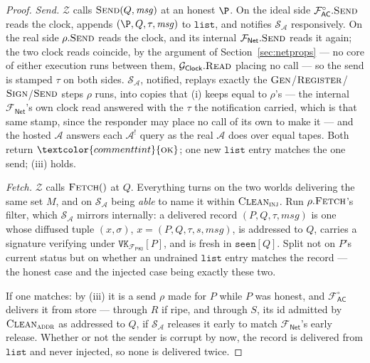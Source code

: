 \documentclass[10pt,oneside,openany]{book}
\newcommand{\Zenv}{\mathcal{Z}}
\newcommand{\Adv}{\mathcal{A}}
\newcommand{\Sim}{\mathcal{S}}
\newcommand{\op}[1]{\textnormal{\textsc{#1}}}
\newcommand{\atom}[1]{\textcolor{commenttint}{\op{#1}}}
\newcommand{\ok}{\atom{ok}}
\newcommand{\Gclock}{\mathcal{G}_{\mathsf{Clock}}}
\newcommand{\Fnet}{\mathcal{F}_{\mathsf{Net}}}
\newcommand{\Facz}{\mathcal{F}^{\circ}_{\mathsf{AC}}}
\newcommand{\Fpki}{\mathcal{F}_{\mathsf{PKI}}}
\newcommand{\msg}{\mathit{msg}}
\newcommand{\Clean}{\op{Clean}}
\newcommand{\V}[1]{\mathtt{#1}}
\theoremstyle{accentdef}
\theoremstyle{accentplain}
\begin{document}
\begin{proof}
\emph{Send.} $\Zenv$ calls $\op{Send}(Q,\msg)$ at an honest $\P$. On the ideal side
$\Facz.\op{Send}$ reads the clock, appends $(\P,Q,\tau,\msg)$ to $\V{list}$, and notifies
$\Sim_{\Adv}$ responsively. On the real side $\rho.\op{Send}$ reads the clock, and its internal
$\Fnet.\op{Send}$ reads it again; the two clock reads coincide, by the argument of
Section~\ref{sec:netprops} --- no core of either execution runs between them, $\Gclock.\op{Read}$
placing no call --- so the send is stamped $\tau$ on both sides. $\Sim_{\Adv}$, notified, replays
exactly the $\op{Gen}$/$\op{Register}$/$\op{Sign}$/$\op{Send}$ steps $\rho$ runs, into copies that
(i) keeps equal to $\rho$'s --- the internal $\Fnet$'s own clock read answered with the $\tau$ the
notification carried, which is that same stamp, since the responder may place no call of its own
to make it --- and the hosted $\Adv$ answers each $\Adv^{!}$ query as the real $\Adv$ does over
equal tapes. Both return $\ok$; one new $\V{list}$ entry matches the one send; (iii) holds.

\emph{Fetch.} $\Zenv$ calls $\op{Fetch}()$ at $Q$. Everything turns on the two worlds delivering
the same set $M$, and on $\Sim_{\Adv}$ being \emph{able} to name it within $\Clean_{\op{inj}}$.
Run $\rho.\op{Fetch}$'s filter, which $\Sim_{\Adv}$ mirrors internally: a delivered record
$(P,Q,\tau,\msg)$ is one whose diffused tuple $(x,\sigma)$, $x = (P,Q,\tau,s,\msg)$, is addressed
to $Q$, carries a signature verifying under $\V{VK}_{\Fpki}[P]$, and is fresh in $\V{seen}[Q]$.
Split not on $P$'s current status but on whether an undrained $\V{list}$ entry matches the
record --- the honest case and the injected case being exactly these two.

If one matches: by (iii) it is a send $\rho$ made for $P$ while $P$ was honest, and $\Facz$
delivers it from store --- through $R$ if ripe, and through $S$, its id admitted by
$\Clean_{\op{addr}}$ as addressed to $Q$, if $\Sim_{\Adv}$ releases it early to match $\Fnet$'s
early release. Whether or not the sender is corrupt by now, the record is delivered from
$\V{list}$ and never injected, so none is delivered twice.


\end{proof}
\end{document}
